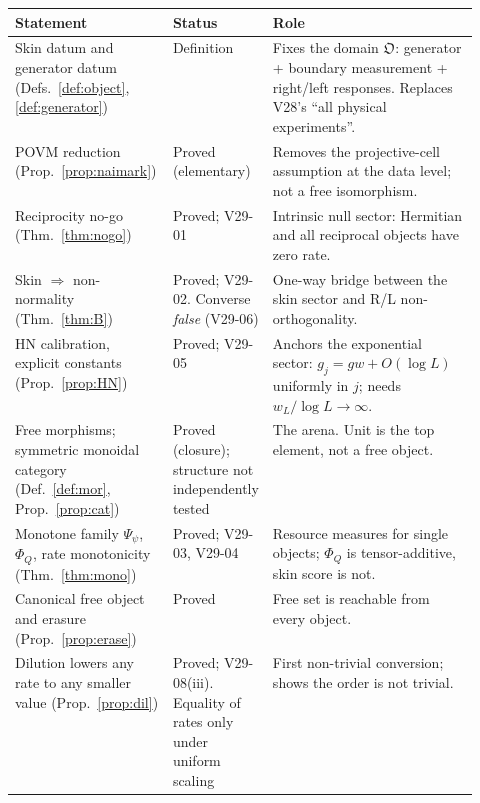 \documentclass[11pt]{article}
\theoremstyle{definition}
\theoremstyle{remark}
\begin{document}
\clearpage
\begin{tcolorbox}[breakable,enhanced,colback=gray!4,colframe=black!70,
  title={\textbf{Status of the universal construction}},fonttitle=\large,boxrule=0.8pt,arc=2pt,left=4pt,right=4pt]
\footnotesize
\renewcommand{\arraystretch}{1.25}
\begin{tabularx}{\linewidth}{@{}>{\raggedright\arraybackslash}p{0.34\linewidth}>{\raggedright\arraybackslash}p{0.20\linewidth}>{\raggedright\arraybackslash}X@{}}
\toprule
\textbf{Statement} & \textbf{Status} & \textbf{Role}\\
\midrule
Skin datum and generator datum (Defs.~\ref{def:object},\ref{def:generator}) & Definition & Fixes the domain $\mathfrak O$: generator + boundary measurement + right/left responses. Replaces V28's ``all physical experiments''.\\
POVM reduction (Prop.~\ref{prop:naimark}) & Proved (elementary) & Removes the projective-cell assumption at the data level; not a free isomorphism.\\
Reciprocity no-go (Thm.~\ref{thm:nogo}) & Proved; V29-01 & Intrinsic null sector: Hermitian and all reciprocal objects have zero rate.\\
Skin $\Rightarrow$ non-normality (Thm.~\ref{thm:B}) & Proved; V29-02. Converse \emph{false} (V29-06) & One-way bridge between the skin sector and R/L non-orthogonality.\\
HN calibration, explicit constants (Prop.~\ref{prop:HN}) & Proved; V29-05 & Anchors the exponential sector: $g_j=gw+O(\log L)$ uniformly in $j$; needs $w_L/\log L\to\infty$.\\
Free morphisms; symmetric monoidal category (Def.~\ref{def:mor}, Prop.~\ref{prop:cat}) & Proved (closure); structure not independently tested & The arena. Unit is the top element, not a free object.\\
Monotone family $\Psi_\psi$, $\Phi_Q$, rate monotonicity (Thm.~\ref{thm:mono}) & Proved; V29-03, V29-04 & Resource measures for single objects; $\Phi_Q$ is tensor-additive, skin score is not.\\
Canonical free object and erasure (Prop.~\ref{prop:erase}) & Proved & Free set is reachable from every object.\\
Dilution lowers any rate to any smaller value (Prop.~\ref{prop:dil}) & Proved; V29-08(iii). Equality of rates only under uniform scaling & First non-trivial conversion; shows the order is not trivial.\\

\end{tabularx}
\end{tcolorbox}
\end{document}
